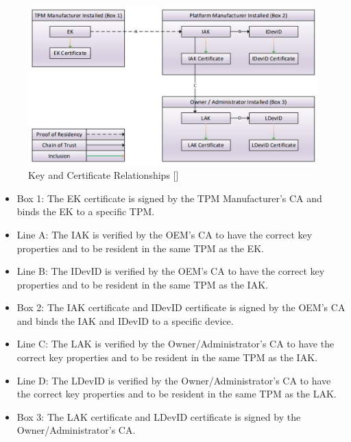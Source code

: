 \begin{figure}[h]
  \begin{centering}
  \includegraphics[width=.8\linewidth]{chap_3_figures/certificateRelationships.jpg}
  \par\end{centering}
  \caption{Key and Certificate Relationships [\cite{DevIDSpec-TCG}]}
  \label{fig:cert_rel}
\end{figure}

\begin{itemize}
  \item Box 1: The EK certificate is signed by the TPM Manufacturer's CA and binds the EK to a specific TPM.
  \item Line A: The IAK is verified by the OEM's CA to have the correct key properties and to be resident in the same TPM as the EK.
  \item Line B: The IDevID is verified by the OEM's CA to have the correct key properties and to be resident in the same TPM as the IAK.
  \item Box 2: The IAK certificate and IDevID certificate is signed by the OEM's CA and binds the IAK and IDevID to a specific device.
  \item Line C: The LAK is verified by the Owner/Administrator's CA to have the correct key properties and to be resident in the same TPM as the IAK.
  \item Line D: The LDevID is verified by the Owner/Administrator's CA to have the correct key properties and to be resident in the same TPM as the LAK.
  \item Box 3: The LAK certificate and LDevID certificate is signed by the Owner/Administrator's CA.
\end{itemize}

